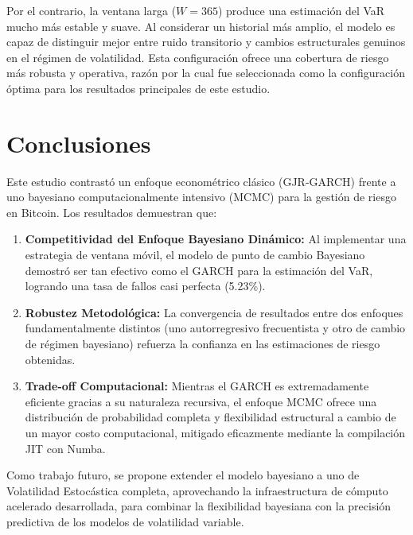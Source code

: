 \documentclass[
]{ceurart}
\begin{document}
Por el contrario, la ventana larga ($W=365$) produce una estimación del VaR mucho más estable y suave. Al considerar un historial más amplio, el modelo es capaz de distinguir mejor entre ruido transitorio y cambios estructurales genuinos en el régimen de volatilidad. Esta configuración ofrece una cobertura de riesgo más robusta y operativa, razón por la cual fue seleccionada como la configuración óptima para los resultados principales de este estudio.

\section{Conclusiones}

Este estudio contrastó un enfoque econométrico clásico (GJR-GARCH) frente a uno bayesiano computacionalmente intensivo (MCMC) para la gestión de riesgo en Bitcoin. Los resultados demuestran que:
\begin{enumerate}
    \item \textbf{Competitividad del Enfoque Bayesiano Dinámico:} Al implementar una estrategia de ventana móvil, el modelo de punto de cambio Bayesiano demostró ser tan efectivo como el GARCH para la estimación del VaR, logrando una tasa de fallos casi perfecta (5.23\%).
    \item \textbf{Robustez Metodológica:} La convergencia de resultados entre dos enfoques fundamentalmente distintos (uno autorregresivo frecuentista y otro de cambio de régimen bayesiano) refuerza la confianza en las estimaciones de riesgo obtenidas.
    \item \textbf{Trade-off Computacional:} Mientras el GARCH es extremadamente eficiente gracias a su naturaleza recursiva, el enfoque MCMC ofrece una distribución de probabilidad completa y flexibilidad estructural a cambio de un mayor costo computacional, mitigado eficazmente mediante la compilación JIT con Numba.
\end{enumerate}

Como trabajo futuro, se propone extender el modelo bayesiano a uno de Volatilidad Estocástica completa, aprovechando la infraestructura de cómputo acelerado desarrollada, para combinar la flexibilidad bayesiana con la precisión predictiva de los modelos de volatilidad variable.




\end{document}
